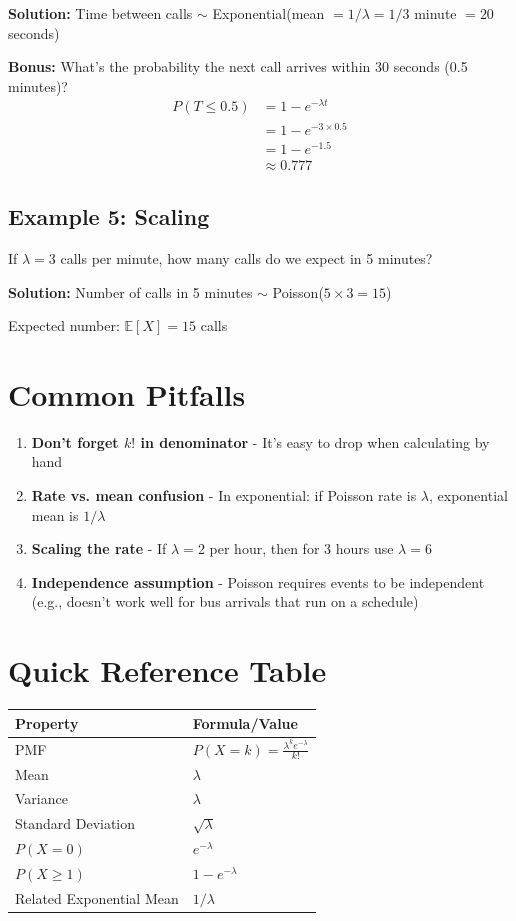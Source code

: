 \documentclass[11pt]{article}
\begin{document}
\textbf{Solution:}
Time between calls $\sim$ Exponential(mean $= 1/\lambda = 1/3$ minute $= 20$ seconds)

\textbf{Bonus:} What's the probability the next call arrives within 30 seconds (0.5 minutes)?
\begin{align*}
P(T \leq 0.5) &= 1 - e^{-\lambda t} \\
&= 1 - e^{-3 \times 0.5} \\
&= 1 - e^{-1.5} \\
&\approx 0.777
\end{align*}

\subsection{Example 5: Scaling}
If $\lambda = 3$ calls per minute, how many calls do we expect in 5 minutes?

\textbf{Solution:}
Number of calls in 5 minutes $\sim$ Poisson($5 \times 3 = 15$)

Expected number: $\mathbb{E}[X] = 15$ calls

\section{Common Pitfalls}

\begin{enumerate}
    \item \textbf{Don't forget $k!$ in denominator} - It's easy to drop when calculating by hand
    \item \textbf{Rate vs. mean confusion} - In exponential: if Poisson rate is $\lambda$, exponential mean is $1/\lambda$
    \item \textbf{Scaling the rate} - If $\lambda = 2$ per hour, then for 3 hours use $\lambda = 6$
    \item \textbf{Independence assumption} - Poisson requires events to be independent (e.g., doesn't work well for bus arrivals that run on a schedule)
\end{enumerate}

\section{Quick Reference Table}

\begin{table}[h]
\centering
\begin{tabular}{@{}ll@{}}
\toprule
\textbf{Property} & \textbf{Formula/Value} \\
\midrule
PMF & $P(X = k) = \frac{\lambda^k e^{-\lambda}}{k!}$ \\
Mean & $\lambda$ \\
Variance & $\lambda$ \\
Standard Deviation & $\sqrt{\lambda}$ \\
$P(X = 0)$ & $e^{-\lambda}$ \\
$P(X \geq 1)$ & $1 - e^{-\lambda}$ \\
Related Exponential Mean & $1/\lambda$ \\
\bottomrule
\end{tabular}
\end{table}
\end{document}
